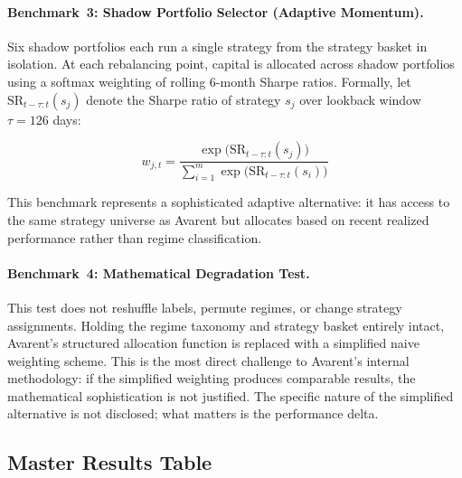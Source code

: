 \documentclass[12pt]{article}
\begin{document}
\paragraph{Benchmark~3: Shadow Portfolio Selector (Adaptive Momentum).}
Six shadow portfolios each run a single strategy from the strategy basket in isolation.
At each rebalancing point, capital is allocated across shadow portfolios using a softmax weighting of rolling 6-month Sharpe ratios.
Formally, let $\text{SR}_{t-\tau:t}(s_j)$ denote the Sharpe ratio of strategy $s_j$ over lookback window $\tau = 126$ days:

\begin{equation}
    w_{j,t} = \frac{\exp\bigl(\text{SR}_{t-\tau:t}(s_j)\bigr)}{\sum_{i=1}^{m} \exp\bigl(\text{SR}_{t-\tau:t}(s_i)\bigr)}
\end{equation}

\noindent
This benchmark represents a sophisticated adaptive alternative: it has access to the same strategy universe as Avarent but allocates based on recent realized performance rather than regime classification.

\paragraph{Benchmark~4: Mathematical Degradation Test.}
This test does not reshuffle labels, permute regimes, or change strategy assignments.
Holding the regime taxonomy and strategy basket entirely intact, Avarent's structured allocation function is replaced with a simplified naive weighting scheme.
This is the most direct challenge to Avarent's internal methodology: if the simplified weighting produces comparable results, the mathematical sophistication is not justified.
The specific nature of the simplified alternative is not disclosed; what matters is the performance delta.

\subsection{Master Results Table}
\end{document}
